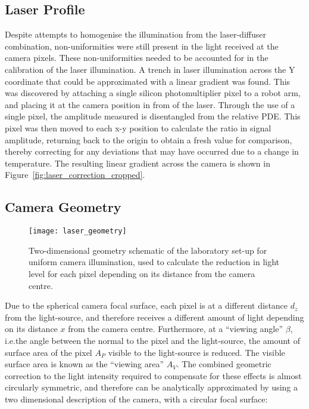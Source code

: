 \subsection{Laser Profile}

Despite attempts to homogenise the illumination from the laser-diffuser combination, non-uniformities were still present in the light received at the camera pixels. These non-uniformities needed to be accounted for in the calibration of the laser illumination. A trench in laser illumination across the Y coordinate that could be approximated with a linear gradient was found. This was discovered by attaching a single silicon photomultiplier pixel to a robot arm, and placing it at the camera position in from of the laser. Through the use of a single pixel, the amplitude measured is disentangled from the relative PDE. This pixel was then moved to each x-y position to calculate the ratio in signal amplitude, returning back to the origin to obtain a fresh value for comparison, thereby correcting for any deviations that may have occurred due to a change in temperature. The resulting linear gradient across the camera is shown in Figure~\ref{fig:laser_correction_cropped}.

\subsection{Camera Geometry}

\begin{figure}
	\centering
    \texttt{[image: laser\_geometry]} 
	\caption[Camera geometry correction schematic.]{Two-dimensional geometry schematic of the laboratory set-up for uniform camera illumination, used to calculate the reduction in light level for each pixel depending on its distance from the camera centre.}
	\label{fig:laser_geometry}
\end{figure}

Due to the spherical camera focal surface, each pixel is at a different distance $d_z$ from the light-source, and therefore receives a different amount of light depending on its distance $x$ from the camera centre. Furthermore, at a ``viewing angle'' $\beta$, i.e.\@ the angle between the normal to the pixel and the light-source, the amount of surface area of the pixel $A_P$ visible to the light-source is reduced. The visible surface area is known as the ``viewing area'' $A_V$. The combined geometric correction to the light intensity required to compensate for these effects is almost circularly symmetric, and therefore can be analytically approximated by using a two dimensional description of the camera, with a circular focal surface:

